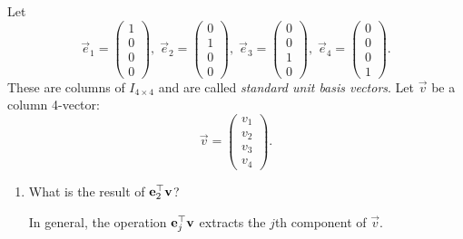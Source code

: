 \documentclass{ximera}
\author{Tae Eun Kim}
\begin{document}
\begin{exercise}
  Let
  \[
    \vec{e}_1 =
    \begin{pmatrix}
      1\\ 0\\ 0\\ 0
    \end{pmatrix},\;
    \vec{e}_2 =
    \begin{pmatrix}
      0\\ 1\\ 0\\ 0
    \end{pmatrix},\;
    \vec{e}_3 =
    \begin{pmatrix}
      0\\ 0\\ 1\\ 0
    \end{pmatrix},\;
    \vec{e}_4 =
    \begin{pmatrix}
      0\\ 0\\ 0\\ 1
    \end{pmatrix}.
  \]
  These are columns of $I_{4 \times 4}$ and are called \textit{standard
    unit basis vectors}.
  Let $\vec{v}$ be a column 4-vector:
  \[
    \vec{v} =
    \begin{pmatrix}
      v_1 \\ v_2 \\ v_3 \\ v_4
    \end{pmatrix}.
  \]

  \begin{enumerate}
  \item What is the result of $\mathbf{e}_2^\top \mathbf{v}$?
    \begin{multipleChoice}
      \pdfOnly{\end{multicols}}
    \end{multipleChoice}
    \begin{feedback}[correct]
      In general, the operation $\mathbf{e}_j^\top \mathbf{v}$ extracts
      the $j$th component of $\vec{v}$.
    \end{feedback}


\end{enumerate}
\end{exercise}
\end{document}
